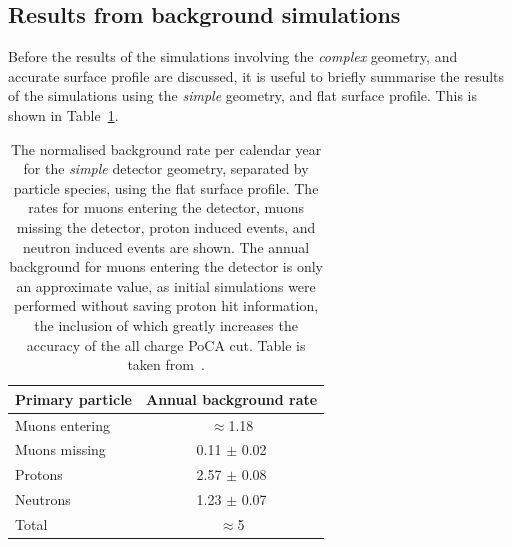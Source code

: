 \subsection{Results from background simulations}
Before the results of the simulations involving the \emph{complex} geometry, and accurate surface profile are discussed, it is useful to briefly summarise the results of the simulations using the \emph{simple} geometry, and flat surface profile. This is shown in Table~\ref{tab:SimpSurfRates}. \\
\begin{table}
  \caption[The normalised background rate per calendar year for the \emph{simple} detector geometry, using the flat surface profile]
          {The normalised background rate per calendar year for the \emph{simple} detector geometry, separated by particle species, using the flat surface profile. The rates for muons entering the detector, muons missing the detector, proton induced events, and neutron induced events are shown. The annual background for muons entering the detector is only an approximate value, as initial simulations were performed without saving proton hit information, the inclusion of which greatly increases the accuracy of the all charge PoCA cut. Table is taken from~\citep{MartinsThesis}.}
  \centering
  \label{tab:SimpSurfRates}
  \begin{tabular}{l c}
    \toprule
        {Primary particle} & {Annual background rate}  \\ 
        \midrule
        Muons entering     & $\approx$1.18             \\

        Muons missing      & 0.11 $\pm$ 0.02           \\

        Protons            & 2.57 $\pm$ 0.08           \\

        Neutrons           & 1.23 $\pm$ 0.07           \\

        Total              & $\approx$5                \\
    \bottomrule
  \end{tabular}
\end{table}

